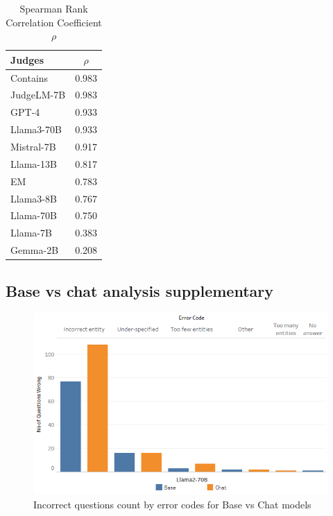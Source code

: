 \begin{table}[htbp]
    \centering
    \caption{Spearman Rank Correlation Coefficient $\rho$}
    \begin{tabular}{lc}
        \toprule
        Judges & $\rho$ \\
        \midrule
        Contains & 0.983 \\
        JudgeLM-7B & 0.983 \\
        GPT-4 & 0.933 \\
        Llama3-70B & 0.933 \\
        Mistral-7B & 0.917 \\
        Llama-13B & 0.817 \\
        EM & 0.783 \\
        Llama3-8B & 0.767 \\
        Llama-70B & 0.750 \\
        Llama-7B & 0.383 \\
        Gemma-2B & 0.208 \\
        \bottomrule
    \end{tabular}
    \label{tab:judges_rho_reversed}
\end{table}

\subsection{Base vs chat analysis supplementary}
\label{app:BaseVsChatSupp}

\label{app:correlationcoefftable}
\begin{figure}[H]
    \includegraphics[width=\linewidth]{figures/Error_Codes_BarPlot.png}
    \caption{}
    \label{fig:comparisonBarplot}
    \caption{Incorrect questions count by error codes for  Base vs Chat models}
     \label{fig:comparisonBarplot}
\end{figure}

